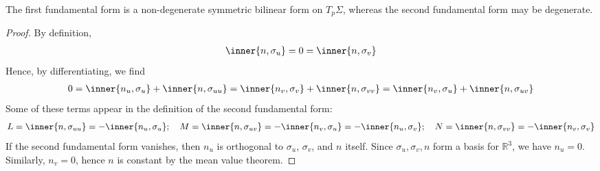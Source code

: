 \begin{remark}
	The first fundamental form is a non-degenerate symmetric bilinear form on $T_p \Sigma$, whereas the second fundamental form may be degenerate.
\end{remark}
\begin{proof}
	By definition,
	\begin{align*}
		\inner{n,\sigma_u} = 0 = \inner{n,\sigma_v}
	\end{align*}
	Hence, by differentiating, we find
	\begin{align*}
		0 = \inner{n_u, \sigma_u} + \inner{n, \sigma_{uu}} = \inner{n_v, \sigma_v} + \inner{n, \sigma_{vv}} = \inner{n_v, \sigma_u} + \inner{n,\sigma_{uv}}
	\end{align*}
	Some of these terms appear in the definition of the second fundamental form:
	\begin{align*}
		L = \inner{n,\sigma_{uu}} = -\inner{n_u, \sigma_u};\quad M = \inner{n,\sigma_{uv}} = -\inner{n_v, \sigma_u} = -\inner{n_u, \sigma_v};\quad N = \inner{n,\sigma_{vv}} = -\inner{n_v, \sigma_v}
	\end{align*}
	If the second fundamental form vanishes, then $n_u$ is orthogonal to $\sigma_u$, $\sigma_v$, and $n$ itself.
	Since $\sigma_u, \sigma_v, n$ form a basis for $\mathbb R^3$, we have $n_u = 0$.
	Similarly, $n_v = 0$, hence $n$ is constant by the mean value theorem.
\end{proof}
